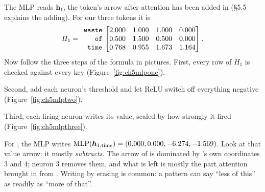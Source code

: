 The MLP reads $\bm{h}_1$, the token's arrow after attention has been added in (\S5.5 explains the adding).
For our three tokens it is
\[
H_1 = \begin{array}{r}\texttt{waste}\\ \texttt{of}\\ \texttt{time}\end{array}\!\!\begin{bmatrix}2.000 & 1.000 & 1.000 & 0.000 \\ 0.500 & 1.500 & 0.500 & 0.000 \\ 0.768 & 0.955 & 1.673 & 1.164\end{bmatrix} .
\]
Now follow the three steps of the formula in pictures. First, every row of $H_1$ is checked against every
key (Figure~\ref{fig:ch5mlpone}).

\begin{center}
\fitwidthFourFive{}
\label{fig:ch5mlpone}
\end{center}

Second, add each neuron's threshold and let ReLU switch off everything negative
(Figure~\ref{fig:ch5mlptwo}).

\begin{center}
\fitwidthFourFive{}
\label{fig:ch5mlptwo}
\end{center}

Third, each firing neuron writes its value, scaled by how strongly it fired (Figure~\ref{fig:ch5mlpthree}).

\begin{center}
\fitwidthFourFive{}
\label{fig:ch5mlpthree}
\end{center}

For , the MLP writes $\operatorname{MLP}(\bm{h}_{1,\text{time}}) = (0.000, 0.000, -6.274, -1.569)$.
Look at that value arrow: it mostly \emph{subtracts}. The arrow of  is dominated by 's own
coordinates 3 and 4; neuron 3 removes them, and what is left is mostly the part attention brought in from
. Writing by erasing is common: a pattern can say ``less of this'' as readily as ``more of that''.

